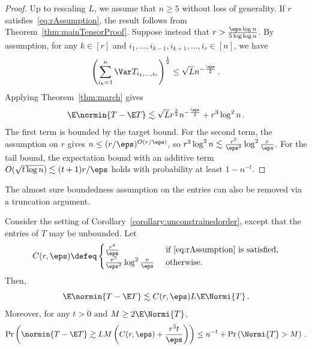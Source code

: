 \documentclass[11pt,a4paper]{article}
\begin{document}
\begin{proof}
   Up to rescaling $L$, we assume that $n\ge 5$ without loss of generality.
   If $r$ satisfies~\eqref{eq:rAssumption},
    the result follows from Theorem~\ref{thm:mainTensorProof}.
    Suppose instead that $r>\frac {\eps \log n} {5\log \log n}$. By 
    assumption, for any  $k\in [r]$ and $i_1, \ldots, i_{k-1}, i_{k+1}, \ldots, i_r\in [n]$, we have
    \[
        \left(\sum_{i_k=1}^n \Var T_{i_1, \ldots, i_r}\right)^{\frac 12}\le \sqrt Ln^{-\frac \eps 2}\,.
    \]
    Applying Theorem~\ref{thm:march}
    gives
    \[
        \E \normin{T - \E T}\lesssim \sqrt {L} r^{\frac 32} n^{-\frac \eps 2} + r^3 \log^2 n\,.
    \]
    The first term is bounded by the target bound. For the second term, the assumption on $r$ gives $n\le (r/\eps)^{O(r/\eps)}$, so $r^3 \log^2 n\lesssim \frac {r^5} {\eps^2} \log^2 \frac r \eps$. For the tail bound, the expectation bound with an additive term $O(\sqrt{ t\log n}) \lesssim (t+1)r/\eps$ holds with probability at least $1-n^{-t}$.
\end{proof}

\noindent The almost sure
boundedness assumption on the entries
can also be removed via a truncation argument.

\begin{corollary}\label{corollary:unboundedsparsetensor}
    Consider the setting of Corollary~\ref{corollary:unconstrainedorder}, except that the entries of $T$ may be unbounded.
    Let
    \begin{equation}
        C(r,\eps) \defeq \begin{cases}\frac {r^4} \eps & \text{ if \eqref{eq:rAssumption} is satisfied,}\\\frac{r^5}{ \eps^2} \log^2 \frac r \eps & \text{ otherwise.}\end{cases}\label{eq:constantCorollary}
    \end{equation}
    Then,
    \[
        \E \normin{T-\E T}\lesssim C(r,\eps) L \E \Normi{T}\,.
    \]
    Moreover, for any $t>0$ and $M \ge 2\E \Normi{T}$,
    \[
        \Pr \left( \normin{T-\E T} \gtrsim   LM\left(C(r,\eps) + \frac{r^{3}t}{\eps} \right)\right) \leq n^{- t} + \Pr\left( \Normi{T} > M\right)\,.
    \]
\end{corollary}
\end{document}
